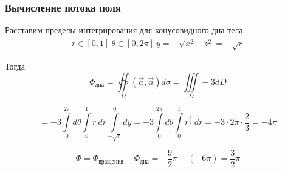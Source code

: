 \begin{frame}\frametitle{Вычисление потока поля}

  Расставим пределы интегрирования для конусовидного дна тела: 
  \begin{align*}
    r \in [0,1] \
    \theta \in [0, 2\pi] \ 
    y = -\sqrt{x^2 + z^2} = -\sqrt{r}
  \end{align*}

  Тогда
  \begin{equation*}
    \Phi_{\text{дна}}
    =  \oiint\limits_{D}\left( \vec {a}, \vec {n} \right) d\sigma = \iiint\limits_D -3 dD
  \end{equation*}
 
  \begin{equation*}
    = -3 \int\limits_{0}^{2 \pi} d \theta
    \int\limits_{0}^{1} r~dr 
    \int\limits_{-\sqrt{r}}^{0} dy 
    = -3 \int\limits_{0}^{2 \pi} d \theta
    \int\limits_{0}^{1}r^{\frac{3}{2}}~dr
    = -3 \cdot 2\pi \cdot \frac{2}{3} = -4 \pi
  \end{equation*}


  \begin{equation*}
    \Phi = \Phi_{\text{вращения}} - \Phi_{\text{дна}} = -\frac{9}{2}\pi - (-6 \pi) = \frac{3}{2}\pi
  \end{equation*}

\end{frame}

